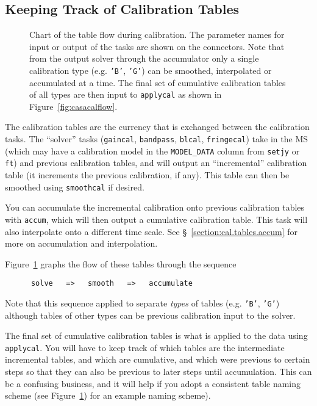 \subsection{Keeping Track of Calibration Tables}
\label{section:cal.flow.tables}

\begin{figure}[h!]
\begin{center}
\caption{\label{fig:casacaltables}
Chart of the table flow during calibration. The parameter names for
input or output of the tasks are shown on the connectors.  Note
that from the output solver through the accumulator only a single 
calibration type (e.g. {\tt 'B'}, {\tt 'G'}) can be smoothed,
interpolated or accumulated at a time.  The final set of
cumulative calibration tables of all types are then input to
{\tt applycal} as shown in Figure~\ref{fig:casacalflow}. }
\hrulefill
\end{center}
\end{figure}

The calibration tables are the currency that is exchanged between
the calibration tasks.  The ``solver'' tasks ({\tt gaincal},
{\tt bandpass}, {\tt blcal}, {\tt fringecal}) take in the MS
(which may have a calibration model in the {\tt MODEL\_DATA}
column from {\tt setjy} or {\tt ft}) and previous calibration
tables, and will output an ``incremental'' calibration table
(it increments the previous calibration, if any).  This table
can then be smoothed using {\tt smoothcal} if desired.

You can accumulate the incremental calibration onto previous
calibration tables with {\tt accum}, which will then output
a cumulative calibration table.
This task will also interpolate onto a different time scale.  
See \S~\ref{section:cal.tables.accum} for more on accumulation
and interpolation.

Figure~\ref{fig:casacaltables} graphs the flow of these tables
through the sequence
\small
\begin{verbatim}
      solve   =>   smooth   =>   accumulate
\end{verbatim}
\normalsize
Note that this sequence applied to separate {\em types} of tables
(e.g. {\tt 'B'}, {\tt 'G'}) although tables of other types can
be previous calibration input to the solver.

The final set of cumulative calibration tables is what is applied
to the data using {\tt applycal}.  You will have to keep track of
which tables are the intermediate incremental tables, and which
are cumulative, and which were previous to certain steps so that
they can also be previous to later steps until accumulation.  This
can be a confusing business, and it will help if you adopt a
consistent table naming scheme (see Figure~\ref{fig:casacaltables})
for an example naming scheme).



